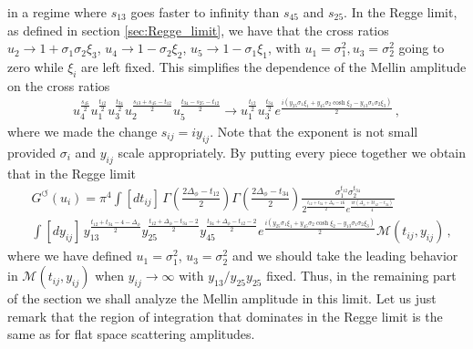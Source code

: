 in a regime where $s_{13}$ goes faster to infinity than $s_{45}$ and $s_{25}$. In the Regge limit, as defined in section \ref{sec:Regge_limit}, we have that the cross ratios  %
$u_2\rightarrow 1+\sigma_1\sigma_2 \xi_3$,  $u_4 \rightarrow 1-\sigma_2\xi_2$, $u_5 \rightarrow 1-\sigma_1\xi_1 $, with $u_1=\sigma_1^2,u_3=\sigma_2^2$ going to zero while $\xi_i$ are left fixed.  This simplifies the dependence of the Mellin amplitude on the cross ratios
\begin{align}
  u_4^{\frac{s_{45}}{2}} u_1^{\frac{t_{12}}{2}} u_3^{\frac{t_{34}}{2}} u_2^{\frac{s_{13}+s_{45}-t_{12}}{2} } u_5^{\frac{t_{34}-s_{25}-t_{12}}{2}} \rightarrow u_1^{\frac{t_{12}}{2}}  u_3^{\frac{t_{34}}{2}} e^{\frac{i(y_{25}\sigma_1\xi_1+y_{45}\sigma_2\cosh \xi_2-y_{13}\sigma_1\sigma_2\xi_3)}{2}}\,,
\end{align}
where we made the change $s_{ij} = iy_{ij}$. Note that the exponent is not small provided $\sigma_{i}$ and $y_{ij}$ scale appropriately.
By putting every piece together we obtain that in the Regge limit
\begin{align}
   & G^{\circlearrowleft}(u_i) = \pi^4\int [dt_{ij}] \,\Gamma \!\left(\frac{2\Delta_{\phi}-t_{12}}{2}\right)\Gamma \!\left(\frac{2\Delta_{\phi}-t_{34}}{2}\right)\frac{\sigma_1^{t_{12}}  \sigma_2^{t_{34}}  }{2^{\frac{t_{12}+t_{34}+\Delta_{\phi}-16 }{2}} e^{\frac{i\pi (\Delta_{\phi} +3t_{12}-t_{34})}{4}}  } \label{eq:ReggeMellinLimit1} \\
   & \int [dy_{ij}] \, y_{13}^{\frac{t_{12}+t_{34}-4-\Delta_{\phi} }{2}}y_{25}^{\frac{t_{12}+\Delta_{\phi}-t_{34}-2}{2}}y_{45}^{\frac{t_{34}+\Delta_{\phi}-t_{12}-2}{2}}e^{\frac{i(y_{25}\sigma_1\xi_1+y_{45}\sigma_2\cosh \xi_2-y_{13}\sigma_1\sigma_2\xi_3)}{2}} \mathcal{M}(t_{ij},y_{ij})\,,
  \nonumber
\end{align}
where we have defined
$u_1=\sigma_1^2$, $u_3=\sigma_2^2$
and we should take the leading behavior in $\mathcal{M}(t_{ij},y_{ij})$ when $y_{ij} \rightarrow \infty$ with $y_{13}/y_{25}y_{25}$ fixed. Thus, in the remaining part of the section we shall  analyze the Mellin amplitude in this limit. Let us just remark that the region of integration that dominates in the Regge limit is the same as for flat space scattering amplitudes.  %

